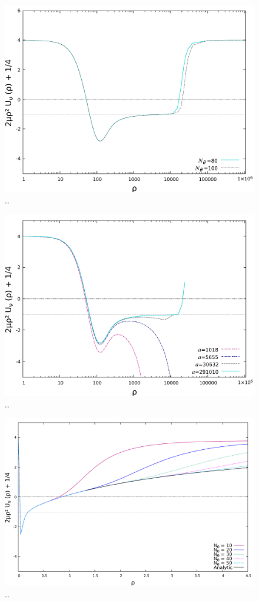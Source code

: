 \begin{figure}
	\includegraphics[width=\linewidth]{diff.pdf}
	\caption{..}
	\label{fig:res_4}
\end{figure}

\begin{figure}
	\includegraphics[width=\linewidth]{positive_a.pdf}
	\caption{..}
	\label{fig:res_5}
\end{figure}

\begin{figure}
	\includegraphics[width=\linewidth]{sn2385.pdf}
	\caption{..}
	\label{fig:res_6}
\end{figure}

